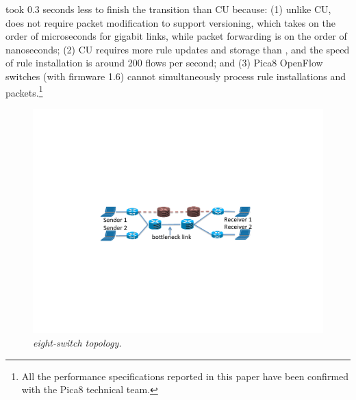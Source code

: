 \name took 0.3 seconds less to finish the transition than CU because: (1) unlike CU, \name does not require packet modification to support versioning, which takes on the order of microseconds for gigabit links, while packet forwarding is on the order of nanoseconds; (2) CU requires more rule updates and storage than \name, and the speed of rule installation is around 200 flows per second; and (3) Pica8 OpenFlow switches (with firmware 1.6) cannot simultaneously process rule installations and packets.\footnote{All the performance specifications reported in this paper have been confirmed with the Pica8 technical team.} %

\begin{figure}[!ht]
  \centering
  \vspace{-0.1in}
  \includegraphics[width=0.7\columnwidth]{figs/dumbell_topo}
  \vspace{-0.1in}
  \caption{\em eight-switch topology.}
  \vspace{-0.15in}
  \label{fig:s_topo}
\end{figure}

